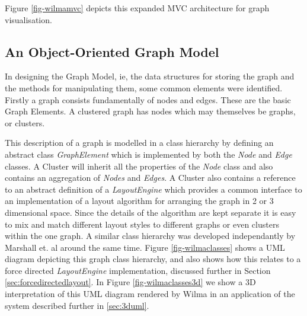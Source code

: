 \documentclass[runningheads]{cl2emult}
\begin{document}
Figure \ref{fig-wilmamvc} depicts this expanded MVC architecture for graph
visualisation. 

\subsection{An Object-Oriented Graph Model}
In designing the Graph Model, ie, the data structures for storing the
graph and the methods for manipulating them, some common
elements were identified.  Firstly a graph consists fundamentally
of nodes and edges.  These are the basic Graph Elements.  A clustered
graph has nodes which may themselves be graphs, or clusters.

This description of a graph is modelled in a class hierarchy by
defining an abstract class {\em GraphElement} which is implemented by
both the {\em Node} and {\em Edge} classes.  A {Cluster} will inherit
all the properties of the {\em Node} class and also contains an
aggregation of {\em Nodes} and {\em Edges}.  A {Cluster} also contains
a reference to an abstract definition of a {\em LayoutEngine} which
provides a common interface to an implementation of a layout algorithm
for arranging the graph in 2 or 3 dimensional space.  Since the
details of the algorithm are kept separate it is easy to mix and match
different layout styles to different graphs or even clusters within
the one graph.  A similar class hierarchy was developed independantly
by Marshall et.  al\cite{marshall00object} around the same time.
Figure \ref{fig-wilmaclasses} shows a UML diagram depicting this
graph class hierarchy, and also shows how this relates to a force
directed {\em LayoutEngine} implementation, discussed further in
Section \ref{sec:forcedirectedlayout}.  In Figure
\ref{fig-wilmaclasses3d} we show a 3D
interpretation of this UML diagram rendered by Wilma in an application
of the system described further in \ref{sec:3duml}.
\end{document}
